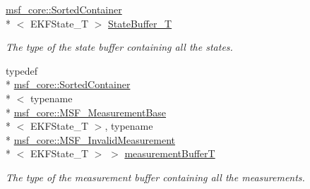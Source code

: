 \begin{DoxyCompactItemize}
\hyperlink{classmsf__core_1_1SortedContainer}{msf\-\_\-core\-::\-Sorted\-Container}\\*
$<$ E\-K\-F\-State\-\_\-\-T $>$ \hyperlink{classmsf__core_1_1MSF__Core_a71db0f8ef9e865ef4d85b7365f01388d}{State\-Buffer\-\_\-\-T}
\begin{DoxyCompactList}\small\item\em The type of the state buffer containing all the states. \end{DoxyCompactList}\item 
typedef \\*
\hyperlink{classmsf__core_1_1SortedContainer}{msf\-\_\-core\-::\-Sorted\-Container}\\*
$<$ typename \\*
\hyperlink{classmsf__core_1_1MSF__MeasurementBase}{msf\-\_\-core\-::\-M\-S\-F\-\_\-\-Measurement\-Base}\\*
$<$ E\-K\-F\-State\-\_\-\-T $>$, typename \\*
\hyperlink{classmsf__core_1_1MSF__InvalidMeasurement}{msf\-\_\-core\-::\-M\-S\-F\-\_\-\-Invalid\-Measurement}\\*
$<$ E\-K\-F\-State\-\_\-\-T $>$ $>$ \hyperlink{classmsf__core_1_1MSF__Core_abbdace8623ce8be7c430f6f7dad6b6fa}{measurement\-Buffer\-T}
\begin{DoxyCompactList}\small\item\em The type of the measurement buffer containing all the measurements. \end{DoxyCompactList}\end{DoxyCompactItemize}
